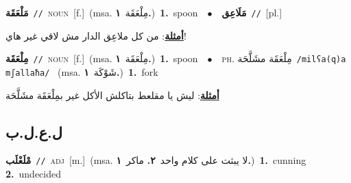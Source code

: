 \documentclass[10pt,a4paper,twoside]{article} %
\begin{document}
\begin{multicols}{2}
{\setlength\topsep{0pt}\textbf{\foreignlanguage{arabic}{مَلْعَقَة}}\ {\color{gray}\texttt{//}\color{black}}\ \textsc{noun}\ [f.]\ \color{gray}(msa. \foreignlanguage{arabic}{مِلْعَقَة}~\foreignlanguage{arabic}{\textbf{١.}})\color{black}\ \textbf{1.}~spoon\ \ $\bullet$\ \ \setlength\topsep{0pt}\textbf{\foreignlanguage{arabic}{مَلَاعِق}}\ {\color{gray}\texttt{//}\color{black}}\ [pl.]\  \begin{flushright}\color{gray}\foreignlanguage{arabic}{\textbf{\underline{\foreignlanguage{arabic}{أمثلة}}}: من كل ملاعِق الدار مش لاقي غير هاي!}\end{flushright}\color{black}} \vspace{2mm}

{\setlength\topsep{0pt}\textbf{\foreignlanguage{arabic}{مِلْعَقَة}}\ {\color{gray}\texttt{//}\color{black}}\ \textsc{noun}\ [f.]\ \color{gray}(msa. \foreignlanguage{arabic}{مِلْعَقَة}~\foreignlanguage{arabic}{\textbf{١.}})\color{black}\ \textbf{1.}~spoon\ \ $\bullet$\ \ \textsc{ph.} \color{gray} \foreignlanguage{arabic}{مِلْعَقَة مشَلَّحَة}\color{black}\ {\color{gray}\texttt{/{\sffamily milʕa(q)a mʃallaħa}/}\color{black}}\ \color{gray} (msa. \foreignlanguage{arabic}{شَوْكَة}~\foreignlanguage{arabic}{\textbf{١.}})\color{black}\ \textbf{1.}~fork\  \begin{flushright}\color{gray}\foreignlanguage{arabic}{\textbf{\underline{\foreignlanguage{arabic}{أمثلة}}}: ليش يا مقلعط بتاكلش الأكل غير بمِلْعَقَة مشَلَّحَة}\end{flushright}\color{black}} \vspace{2mm}

\vspace{-3mm}
\subsection*{\color{blue}\foreignlanguage{arabic}{ل.ع.ل.ب}\color{blue}{}} 

{\setlength\topsep{0pt}\textbf{\foreignlanguage{arabic}{مْلَعْلَب}}\ {\color{gray}\texttt{//}\color{black}}\ \textsc{adj}\ [m.]\ \color{gray}(msa. \foreignlanguage{arabic}{لا يبثت على كلام واحد}~\foreignlanguage{arabic}{\textbf{٢.}}  \foreignlanguage{arabic}{ماكر}~\foreignlanguage{arabic}{\textbf{١.}})\color{black}\ \textbf{1.}~cunning  \textbf{2.}~undecided\ } \vspace{2mm}


\end{multicols}
\end{document}
